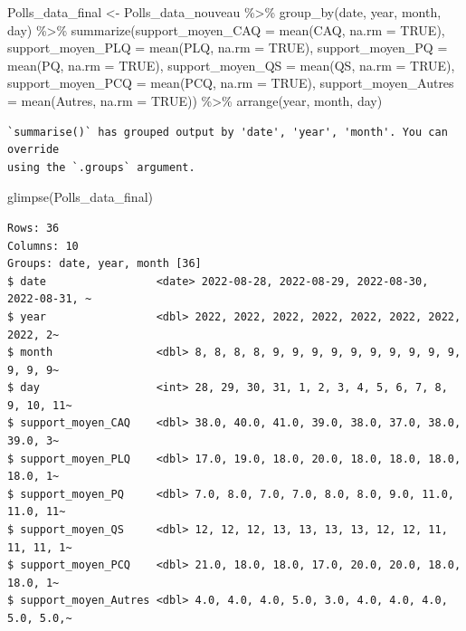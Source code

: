 \documentclass[
  letterpaper,
  DIV=11,
  numbers=noendperiod]{scrartcl}
\newenvironment{Shaded}{\begin{snugshade}}{\end{snugshade}}
\newcommand{\AttributeTok}[1]{\textcolor[rgb]{0.40,0.45,0.13}{#1}}
\newcommand{\ConstantTok}[1]{\textcolor[rgb]{0.56,0.35,0.01}{#1}}
\newcommand{\FunctionTok}[1]{\textcolor[rgb]{0.28,0.35,0.67}{#1}}
\newcommand{\NormalTok}[1]{\textcolor[rgb]{0.00,0.23,0.31}{#1}}
\newcommand{\OtherTok}[1]{\textcolor[rgb]{0.00,0.23,0.31}{#1}}
\newcommand{\SpecialCharTok}[1]{\textcolor[rgb]{0.37,0.37,0.37}{#1}}
\begin{document}
\begin{Shaded}
\begin{Highlighting}[]
\NormalTok{Polls\_data\_final }\OtherTok{\textless{}{-}}\NormalTok{ Polls\_data\_nouveau }\SpecialCharTok{\%\textgreater{}\%} \FunctionTok{group\_by}\NormalTok{(date, year, month, day) }\SpecialCharTok{\%\textgreater{}\%} \FunctionTok{summarize}\NormalTok{(}\AttributeTok{support\_moyen\_CAQ =} \FunctionTok{mean}\NormalTok{(CAQ, }\AttributeTok{na.rm =} \ConstantTok{TRUE}\NormalTok{), }\AttributeTok{support\_moyen\_PLQ =} \FunctionTok{mean}\NormalTok{(PLQ, }\AttributeTok{na.rm =} \ConstantTok{TRUE}\NormalTok{), }\AttributeTok{support\_moyen\_PQ =} \FunctionTok{mean}\NormalTok{(PQ, }\AttributeTok{na.rm =} \ConstantTok{TRUE}\NormalTok{), }\AttributeTok{support\_moyen\_QS =} \FunctionTok{mean}\NormalTok{(QS, }\AttributeTok{na.rm =} \ConstantTok{TRUE}\NormalTok{), }\AttributeTok{support\_moyen\_PCQ =} \FunctionTok{mean}\NormalTok{(PCQ, }\AttributeTok{na.rm =} \ConstantTok{TRUE}\NormalTok{), }\AttributeTok{support\_moyen\_Autres =} \FunctionTok{mean}\NormalTok{(Autres, }\AttributeTok{na.rm =} \ConstantTok{TRUE}\NormalTok{)) }\SpecialCharTok{\%\textgreater{}\%} \FunctionTok{arrange}\NormalTok{(year, month, day)}
\end{Highlighting}
\end{Shaded}

\begin{verbatim}
`summarise()` has grouped output by 'date', 'year', 'month'. You can override
using the `.groups` argument.
\end{verbatim}

\begin{Shaded}
\begin{Highlighting}[]
\FunctionTok{glimpse}\NormalTok{(Polls\_data\_final)}
\end{Highlighting}
\end{Shaded}

\begin{verbatim}
Rows: 36
Columns: 10
Groups: date, year, month [36]
$ date                 <date> 2022-08-28, 2022-08-29, 2022-08-30, 2022-08-31, ~
$ year                 <dbl> 2022, 2022, 2022, 2022, 2022, 2022, 2022, 2022, 2~
$ month                <dbl> 8, 8, 8, 8, 9, 9, 9, 9, 9, 9, 9, 9, 9, 9, 9, 9, 9~
$ day                  <int> 28, 29, 30, 31, 1, 2, 3, 4, 5, 6, 7, 8, 9, 10, 11~
$ support_moyen_CAQ    <dbl> 38.0, 40.0, 41.0, 39.0, 38.0, 37.0, 38.0, 39.0, 3~
$ support_moyen_PLQ    <dbl> 17.0, 19.0, 18.0, 20.0, 18.0, 18.0, 18.0, 18.0, 1~
$ support_moyen_PQ     <dbl> 7.0, 8.0, 7.0, 7.0, 8.0, 8.0, 9.0, 11.0, 11.0, 11~
$ support_moyen_QS     <dbl> 12, 12, 12, 13, 13, 13, 13, 12, 12, 11, 11, 11, 1~
$ support_moyen_PCQ    <dbl> 21.0, 18.0, 18.0, 17.0, 20.0, 20.0, 18.0, 18.0, 1~
$ support_moyen_Autres <dbl> 4.0, 4.0, 4.0, 5.0, 3.0, 4.0, 4.0, 4.0, 5.0, 5.0,~
\end{verbatim}
\end{document}
